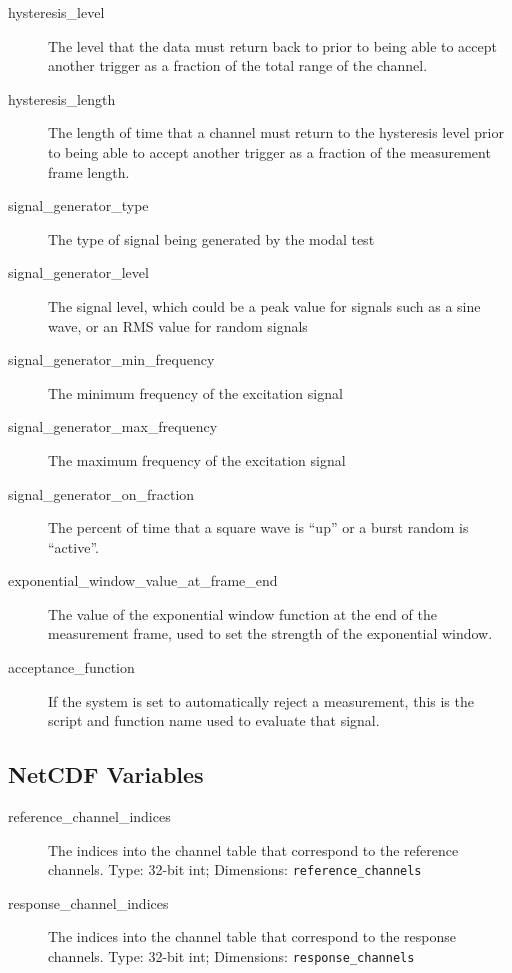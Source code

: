 \documentclass[pdf,12pt,report]{SANDreport}
\newcommand{\inlineCode}{\lstinline[basicstyle=\bfseries\ttfamily]}
\begin{document}
\begin{description}
        \item[hysteresis\_level] The level that the data must return back to prior to being able to accept another trigger as a fraction of the total range of the channel.
        \item[hysteresis\_length] The length of time that a channel must return to the hysteresis level prior to being able to accept another trigger as a fraction of the measurement frame length.
        \item[signal\_generator\_type] The type of signal being generated by the modal test
        \item[signal\_generator\_level] The signal level, which could be a peak value for signals such as a sine wave, or an \ac{RMS} value for random signals
        \item[signal\_generator\_min\_frequency] The minimum frequency of the excitation signal
        \item[signal\_generator\_max\_frequency] The maximum frequency of the excitation signal
        \item[signal\_generator\_on\_fraction] The percent of time that a square wave is ``up'' or a burst random is ``active''.
        \item[exponential\_window\_value\_at\_frame\_end] The value of the exponential window function at the end of the measurement frame, used to set the strength of the exponential window.
        \item[acceptance\_function] If the system is set to automatically reject a measurement, this is the script and function name used to evaluate that signal.
    \end{description}
    
    \subsection{NetCDF Variables}
    \begin{description}
        \item[reference\_channel\_indices] The indices into the channel table that correspond to the reference channels.  Type: 32-bit int; Dimensions: \inlineCode{reference_channels}
        \item[response\_channel\_indices] The indices into the channel table that correspond to the response channels.  Type: 32-bit int; Dimensions: \inlineCode{response_channels}       
    \end{description}
\end{document}
